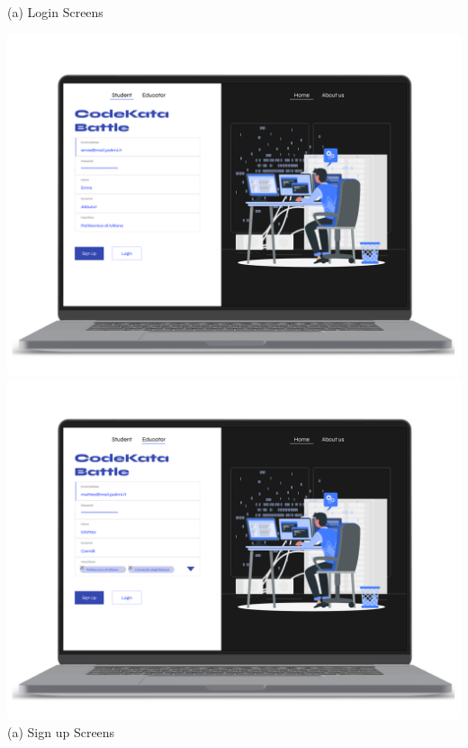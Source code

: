     \begin{center}
        (a) Login Screens
    \end{center}
\begin{center}
    \includegraphics[scale=0.13]{Images/ui-ux/login-signup/student_signup.png}
    \includegraphics[scale=0.13]{Images/ui-ux/login-signup/educator_signup.png}
    (a) Sign up Screens
\end{center}
\newpage
